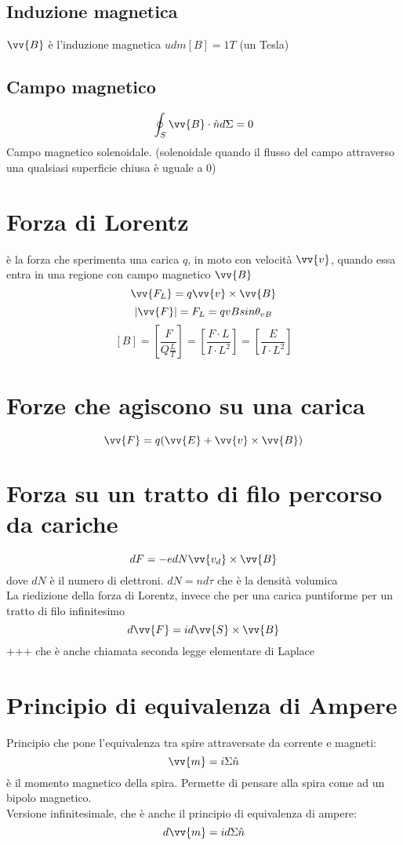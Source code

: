 \documentclass[a4paper]{report}
\begin{document}
  \subsection{Induzione magnetica}
  $\vv{B}$ è l'induzione magnetica $udm[B] = 1T$ (un Tesla)
  \subsection{Campo magnetico}
  $$ \oint_S \vv{B}\cdot \hat{n} d\Sigma = 0 $$
  Campo magnetico solenoidale. (solenoidale quando il flusso del campo attraverso una qualsiasi superficie chiusa è uguale a 0)

  \section{Forza di Lorentz}
  è la forza che sperimenta una carica $q$, in moto con velocità $\vv{v}$, quando essa entra in una regione con campo magnetico $\vv{B}$
  $$ \vv{F_L} = q\vv{v} \times \vv{B} $$
  $$ |\vv{F}| = F_L = qvB sin\theta_{vB} $$
  $$ [B] = [\frac{F}{Q\frac{L}{T}}] = [\frac{F\cdot L}{I\cdot L^2}] = [\frac{E}{I\cdot L^2}] $$

  \section{Forze che agiscono su una carica}
  $$ \vv{F} = q(\vv{E} + \vv{v} \times \vv{B}) $$

  \section{Forza su un tratto di filo percorso da cariche}
  $$ dF = -e dN \vv{v_d} \times \vv{B}$$
  dove $dN$ è il numero di elettroni. $dN = nd\tau$ che è la densità volumica\\
  La riedizione della forza di Lorentz, invece che per una carica puntiforme per un tratto di filo infinitesimo
  $$ d\vv{F} = i d\vv{S} \times \vv{B} $$+++
  che è anche chiamata seconda legge elementare di Laplace

  \section{Principio di equivalenza di Ampere}
  Principio che pone l'equivalenza tra spire attraversate da corrente e magneti:
  $$ \vv{m} = i \Sigma \hat{n} $$
  è il momento magnetico della spira. Permette di pensare alla spira come ad un bipolo magnetico.\\
  Versione infinitesimale, che è anche il principio di equivalenza di ampere:
  $$ d\vv{m} = id\Sigma \hat{n} $$
\end{document}

